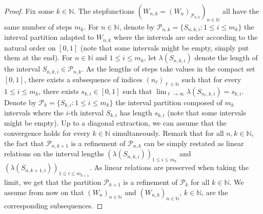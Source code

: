 \documentclass{amsart}
\theoremstyle{plain}
\theoremstyle{definition}
\newcommand{\cp}{\mathcal{P}}
\newcommand{\cP}{\mathcal{P}}
\newcommand{\N}{\mathbb{N}}
\begin{document}
\begin{proof}
Fix        some        $k\in       \N$.         The        stepfunctions
$(W_{n,k}=(W_n)_{\cp_{n,k}}  )_{n\in\N}$ all  have the  same number  of
steps       $m_k$.       For       $n\in\N$,      denote       by
$\mathcal{P}_{n,k} =  \{ S_{n,k, i}  : 1\leq i\leq m_k\}$  the interval partition
adapted  to  $W_{n,k}$ 
where the intervals are order according to the natural order on $[0,1]$
(note that some intervals might be empty, simply put them at the end).
For  $n\in\N$ and  $1\leq  i\leq  m_k$,  let $\lambda(S_{n,k,i})$ denote 
the  length of the  interval $S_{n,k,i}\in\mathcal{P}_{n,k}$.  
As  the lengths of steps  take values in
the  compact  set $[0,1]$,  there exists  
a subsequence of indices $(n_\ell)_{\ell\in\N}$
such  that  for  every  $1\leq i  \leq  m_k$,  there  exists
$s_{k,i}            \in            [0,1]$           such            that
$\lim_{\ell\rightarrow \infty } \lambda(S_{n_\ell,k,i}) =s_{k,i}$. 
Denote by $\cp_k = \{ S_{k, i} : 1\leq i\leq m_k\}$ the interval partition
composed of $m_k$ intervals where the $i$-th interval $S_{k,i}$
	has length $s_{k,i}$
	(note that some intervals might be empty).
Up to a diagonal extraction, we can assume that 
the convergence holds for every $k\in\N$ simultaneously.
Remark that for all $n,k\in\N$, 
	the fact that $\cP_{n,k+1}$ is a refinement of $\cP_{n,k}$
	can be simply restated as linear relations on the interval lengths 
	$(\lambda(S_{n,k,i}))_{1\leq i \leq m_k}$ and $(\lambda(S_{n,k+1,i}))_{1\leq i \leq m_{k+1}}$.
As linear relations are preserved when taking the limit, we get that 
the partition $\cp_{k+1}$ is a refinement
of $\cp_k$ for  all $k\in \N$.
We  assume from now on
that $(W_n )_{n\in\N}$ and $(W_{n,k} )_{n\in\N}$, $k\in\N$, are the corresponding
subsequences.


\end{proof}
\end{document}
